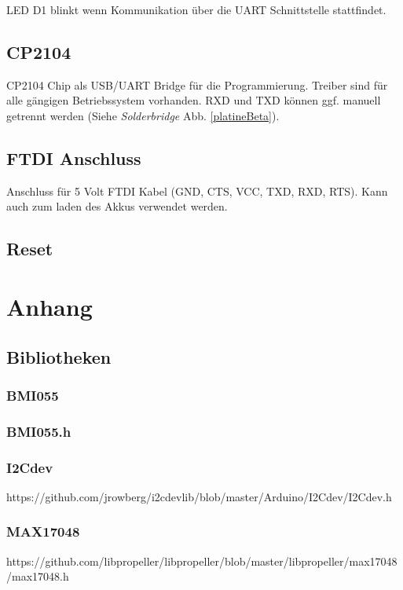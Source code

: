 \documentclass[10pt, a4paper, onecolumn]{article} %
\begin{document}
LED D1 blinkt wenn Kommunikation über die UART Schnittstelle stattfindet.

\subsection{CP2104 }
\label{CP2104}
CP2104 Chip als USB/UART Bridge für die Programmierung. Treiber sind für alle gängigen Betriebssystem vorhanden. RXD und TXD können ggf. manuell getrennt werden (Siehe \emph{Solderbridge} Abb. \ref{platineBeta}).

\subsection{FTDI Anschluss }
\label{FTDI}
Anschluss für 5 Volt FTDI Kabel (GND, CTS, VCC, TXD, RXD, RTS). Kann auch zum laden des Akkus verwendet werden.

\subsection{Reset}
\label{reset}
\blindtext

\section{Anhang}
\subsection{Bibliotheken}
\subsubsection{BMI055}

\subsubsection{BMI055.h}



\subsubsection{I2Cdev}
https://github.com/jrowberg/i2cdevlib/blob/master/Arduino/I2Cdev/I2Cdev.h
\subsubsection{MAX17048}
https://github.com/libpropeller/libpropeller/blob/master/libpropeller/max17048/max17048.h
\printbibliography[title={Datenblätter}] %

\end{document}
